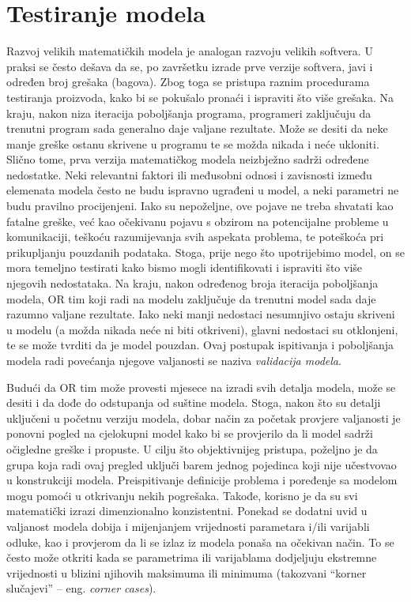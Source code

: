 \documentclass[a4paper, utf8, 11pt, colorlinks]{book}
\begin{document}


\section{Testiranje modela}
Razvoj velikih matematičkih modela je analogan razvoju velikih softvera. U praksi se često dešava da se, po završetku izrade prve verzije softvera, javi i određen broj grešaka (bagova). Zbog toga se pristupa raznim procedurama testiranja proizvoda, kako bi se pokušalo pronaći i
ispraviti što više grešaka. Na kraju, nakon niza iteracija poboljšanja programa, programeri zaključuju da trenutni program sada generalno
daje  valjane rezultate. Može se desiti da neke manje greške ostanu skrivene u programu te se možda   nikada i neće ukloniti. Slično tome, prva verzija matematičkog modela neizbježno sadrži određene
nedostatke. Neki relevantni faktori ili međusobni odnosi i zavisnosti između elemenata modela često ne budu  ispravno ugrađeni
u model, a neki parametri ne budu pravilno procijenjeni. Iako su nepoželjne, ove pojave ne treba shvatati kao fatalne greške, već kao očekivanu pojavu s obzirom na potencijalne probleme u komunikaciji, teškoću razumijevanja svih aspekata problema, te poteškoća pri prikupljanju pouzdanih podataka. Stoga, prije nego što upotrijebimo model, on se mora  temeljno testirati kako bismo mogli  identifikovati 
i ispraviti što više njegovih nedostataka. Na kraju, nakon određenog broja iteracija poboljšanja 
modela, OR tim koji radi na modelu zaključuje da trenutni model sada daje razumno valjane rezultate.  Iako neki manji nedostaci nesumnjivo ostaju skriveni u modelu (a možda nikada neće ni biti otkriveni), glavni nedostaci su otklonjeni, te se može tvrditi da je model pouzdan. Ovaj postupak ispitivanja i poboljšanja modela radi povećanja njegove valjanosti se naziva \emph{validacija modela}. 

Budući da OR tim može provesti mjesece na izradi svih detalja modela, može se desiti i da dođe do odstupanja od suštine modela. Stoga, nakon što su detalji uključeni u 
početnu verziju modela, dobar način za početak provjere valjanosti je ponovni pogled na cjelokupni model kako bi se provjerilo da li model sadrži  očigledne greške i propuste. U cilju što objektivnijeg pristupa, poželjno je da grupa koja radi ovaj pregled uključi barem jednog pojedinca koji nije učestvovao u konstrukciji modela. Preispitivanje definicije
problema i poređenje sa modelom mogu pomoći u otkrivanju nekih pogrešaka. Takođe, korisno je da su svi matematički izrazi dimenzionalno konzistentni.  Ponekad se  dodatni uvid u valjanost modela dobija i 
mijenjanjem vrijednosti parametara i/ili varijabli odluke, kao i provjerom da li se  izlaz iz modela ponaša na očekivan način. To se često može otkriti kada se parametrima ili varijablama dodjeljuju ekstremne vrijednosti u blizini njihovih maksimuma ili minimuma (takozvani ``korner slučajevi'' -- eng. \textit{corner cases}). 
\end{document}
